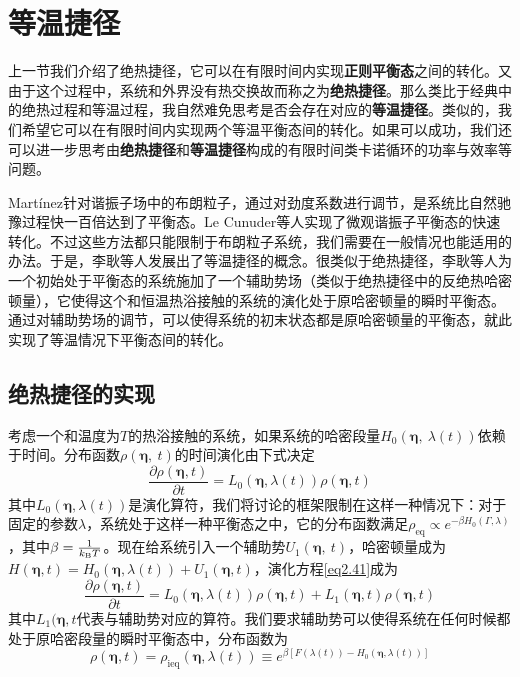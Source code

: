 \section{等温捷径}
    
\qquad 上一节我们介绍了绝热捷径，它可以在有限时间内实现\textbf{正则平衡态}之间的转化。又由于这个过程中，系统和外界没有热交换故而称之为\textbf{绝热捷径}。那么类比于经典中的绝热过程和等温过程，我自然难免思考是否会存在对应的\textbf{等温捷径}。类似的，我们希望它可以在有限时间内实现两个等温平衡态间的转化。如果可以成功，我们还可以进一步思考由\textbf{绝热捷径}和\textbf{等温捷径}构成的有限时间类卡诺循环的功率与效率等问题。

Martínez\cite{Martinez2016}针对谐振子场中的布朗粒子，通过对劲度系数进行调节，是系统比自然驰豫过程快一百倍达到了平衡态。Le Cunuder等人\cite{LeCunuder2016}实现了微观谐振子平衡态的快速转化。不过这些方法都只能限制于布朗粒子系统，我们需要在一般情况也能适用的办法。于是，李耿等人\cite{Li2016}发展出了等温捷径的概念。很类似于绝热捷径，李耿等人为一个初始处于平衡态的系统施加了一个辅助势场（类似于绝热捷径中的反绝热哈密顿量），它使得这个和恒温热浴接触的系统的演化处于原哈密顿量的瞬时平衡态。通过对辅助势场的调节，可以使得系统的初末状态都是原哈密顿量的平衡态，就此实现了等温情况下平衡态间的转化。

\subsection{绝热捷径的实现}

考虑一个和温度为$T$的热浴接触的系统，如果系统的哈密段量$H_0 \left(\bm{\eta},\ \lambda\left( t \right) \right)$依赖于时间。分布函数$\rho (\bm{\eta},\ t)$的时间演化由下式决定
\begin{equation}
    \frac{\partial \rho(\bm{\eta}, t)}{\partial t}=L_{0}(\bm{\eta}, \lambda(t)) \rho(\bm{\eta}, t)
    \label{eq2.41}
\end{equation}
其中$L_{0}(\bm{\eta}, \lambda(t))$是演化算符，我们将讨论的框架限制在这样一种情况下：对于固定的参数$\lambda$，系统处于这样一种平衡态之中，它的分布函数满足$\rho_{\mathrm{eq}} \propto e^{-\beta H_{0}(\Gamma, \lambda)}$，其中$\beta= \frac{1}{k_{\mathrm{B}} T}$。现在给系统引入一个辅助势$U_1 (\bm{\eta},\ t)$，哈密顿量成为$H(\bm{\eta}, t)=H_{0}(\bm{\eta}, \lambda(t))+U_{1}(\bm{\eta}, t)$，演化方程\eqref{eq2.41}成为
\begin{equation}
    \frac{\partial \rho(\bm{\eta}, t)}{\partial t}=L_{0}(\bm{\eta}, \lambda(t)) \rho(\bm{\eta}, t)+L_{1}(\bm{\eta}, t) \rho(\bm{\eta}, t)
    \label{eq2.42}
\end{equation}
其中$L_{1}(\bm{\eta}, t$代表与辅助势对应的算符。我们要求辅助势可以使得系统在任何时候都处于原哈密段量的瞬时平衡态中，分布函数为
\begin{equation}
    \rho(\bm{\eta}, t)=\rho_{\mathrm{ieq}}(\bm{\eta}, \lambda(t)) \equiv e^{\beta\left[F(\lambda(t))-H_{0}(\bm{\eta}, \lambda(t))\right]}
    \label{eq2.43}
\end{equation}















